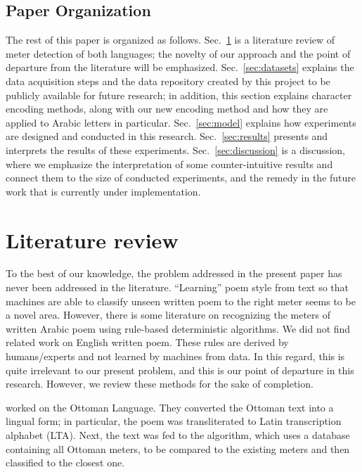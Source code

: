 \documentclass[journal,10pt,twocolumns,letter]{IEEEtran}
\begin{document}
\subsection{Paper Organization}\label{sec:paper-organization}
The rest of this paper is organized as follows. Sec.~\ref{sec:literature-review} is a literature
review of meter detection of both languages; the novelty of our approach and the point of departure
from the literature will be emphasized. Sec.~\ref{sec:datasets} explains the data acquisition steps
and the data repository created by this project to be publicly available for future research; in
addition, this section explains character encoding methods, along with our new encoding method and
how they are applied to Arabic letters in particular. Sec.~\ref{sec:model} explains how experiments
are designed and conducted in this research. Sec.~\ref{sec:results} presents and interprets the
results of these experiments. Sec.~\ref{sec:discussion} is a discussion, where we emphasize the
interpretation of some counter-intuitive results and connect them to the size of conducted
experiments, and the remedy in the future work that is currently under implementation.




\section{Literature review}\label{sec:literature-review}
To the best of our knowledge, the problem addressed in the present paper has never been addressed in
the literature. ``Learning'' poem style from text so that machines are able to classify unseen
written poem to the right meter seems to be a novel area. However, there is some literature on
recognizing the meters of written Arabic poem using rule-based deterministic algorithms. We did not
find related work on English written poem. These rules are derived by humans/experts and not learned
by machines from data. In this regard, this is quite irrelevant to our present problem, and this is
our point of departure in this research. However, we review these methods for the sake of
completion.

\cite{Kurt2012AlgorithmForDetectionAnalysis} worked on the Ottoman Language. They converted the
Ottoman text into a lingual form; in particular, the poem was transliterated to Latin transcription
alphabet (LTA). Next, the text was fed to the algorithm, which uses a database containing all
Ottoman meters, to be compared to the existing meters and then classified to the closest one.
\end{document}
